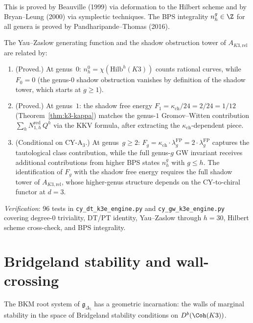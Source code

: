 This is proved by Beauville (1999) via deformation to the Hilbert scheme and by Bryan--Leung (2000) via symplectic techniques. The BPS integrality $n_h^g \in \Z$ for all genera is proved by Pandharipande--Thomas (2016).

\begin{proposition}
\label{prop:k3e-bps-shadow}
The Yau--Zaslow generating function and the shadow obstruction tower of $A_{K3,\mathrm{rel}}$ are related by:
\begin{enumerate}[label=(\roman*)]
 \item \textup{(Proved.)} At genus~$0$: $n_h^0 = \chi(\mathrm{Hilb}^h(K3))$ counts rational curves, while $F_0 = 0$ (the genus-$0$ shadow obstruction vanishes by definition of the shadow tower, which starts at $g \geq 1$).
 \item \textup{(Proved.)} At genus~$1$: the shadow free energy $F_1 = \kappa_{\mathrm{ch}} / 24 = 2/24 = 1/12$ (Theorem~\ref{thm:k3-kappa}) matches the genus-$1$ Gromov--Witten contribution $\sum_h N_{1,h}^{\mathrm{red}} \, Q^h$ via the KKV formula, after extracting the $\kappa_{\mathrm{ch}}$-dependent piece.
 \item \textup{(Conditional on CY-A$_3$.)} At genus~$g \geq 2$: $F_g = \kappa_{\mathrm{ch}} \cdot \lambda_g^{\mathrm{FP}} = 2 \cdot \lambda_g^{\mathrm{FP}}$ captures the tautological class contribution, while the full genus-$g$ GW invariant receives additional contributions from higher BPS states $n_h^g$ with $g \leq h$. The identification of $F_g$ with the shadow free energy requires the full shadow tower of $A_{K3,\mathrm{rel}}$, whose higher-genus structure depends on the CY-to-chiral functor at $d = 3$.
\end{enumerate}
\end{proposition}

\noindent\textit{Verification}: 96 tests in \texttt{cy\_dt\_k3e\_engine.py} and \texttt{cy\_gw\_k3e\_engine.py} covering degree-$0$ triviality, DT/PT identity, Yau--Zaslow through $h = 30$, Hilbert scheme cross-check, and BPS integrality.


\section{Bridgeland stability and wall-crossing}
\label{sec:k3e-wall-crossing}

The BKM root system of $\mathfrak{g}_{\Delta_5}$ has a geometric incarnation: the walls of marginal stability in the space of Bridgeland stability conditions on $D^b(\Coh(K3))$.

